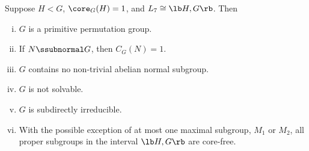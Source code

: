 \begin{frame}[fragile,label=L7second,shrink=5]{}
  \begin{center}
    {
      \begin{tikzpicture}[scale=.7]
        
      \end{tikzpicture}
    }
  \end{center}

\begin{prop}
\label{thm:except-seven-elem}
Suppose $H<G$, $\core_G(H) = 1$, and 
$L_7 \cong \lb H,G \rb$.  Then
\begin{enumerate}[(i)]
\item<1-> $G$ is a primitive permutation group.
\item<1-> If $N\ssubnormal G$, then $C_G(N) = 1$.
\item<1-> $G$ contains no non-trivial abelian normal subgroup.
\item<1-> $G$ is not solvable.
\item<1-> $G$ is subdirectly irreducible.
\item<1-> With the possible exception of at most one maximal subgroup, $M_1$ or $M_2$,
  all proper subgroups in the interval $\lb H,G \rb$ are core-free. 

\end{enumerate}
\end{prop}
\end{frame}

